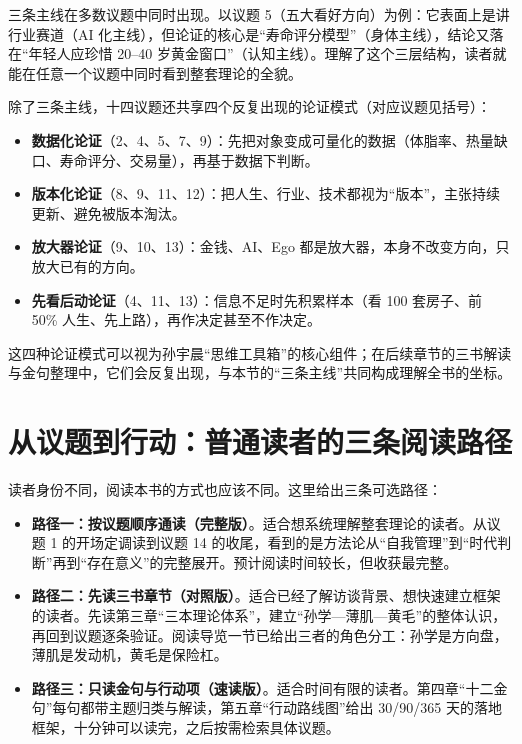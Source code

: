 三条主线在多数议题中同时出现。以议题
5（五大看好方向）为例：它表面上是讲行业赛道（AI
化主线），但论证的核心是``寿命评分模型''（身体主线），结论又落在``年轻人应珍惜
20--40
岁黄金窗口''（认知主线）。理解了这个三层结构，读者就能在任意一个议题中同时看到整套理论的全貌。

除了三条主线，十四议题还共享四个反复出现的论证模式（对应议题见括号）：

\begin{itemize}
\tightlist
\item
  \textbf{数据化论证}（2、4、5、7、9）：先把对象变成可量化的数据（体脂率、热量缺口、寿命评分、交易量），再基于数据下判断。
\item
  \textbf{版本化论证}（8、9、11、12）：把人生、行业、技术都视为``版本''，主张持续更新、避免被版本淘汰。
\item
  \textbf{放大器论证}（9、10、13）：金钱、AI、Ego
  都是放大器，本身不改变方向，只放大已有的方向。
\item
  \textbf{先看后动论证}（4、11、13）：信息不足时先积累样本（看 100
  套房子、前 50\% 人生、先上路），再作决定甚至不作决定。
\end{itemize}

这四种论证模式可以视为孙宇晨``思维工具箱''的核心组件；在后续章节的三书解读与金句整理中，它们会反复出现，与本节的``三条主线''共同构成理解全书的坐标。

\section{从议题到行动：普通读者的三条阅读路径}

读者身份不同，阅读本书的方式也应该不同。这里给出三条可选路径：

\begin{itemize}
\tightlist
\item
  \textbf{路径一：按议题顺序通读（完整版）}。适合想系统理解整套理论的读者。从议题
  1 的开场定调读到议题 14
  的收尾，看到的是方法论从``自我管理''到``时代判断''再到``存在意义''的完整展开。预计阅读时间较长，但收获最完整。
\item
  \textbf{路径二：先读三书章节（对照版）}。适合已经了解访谈背景、想快速建立框架的读者。先读第三章``三本理论体系''，建立``孙学---薄肌---黄毛''的整体认识，再回到议题逐条验证。阅读导览一节已给出三者的角色分工：孙学是方向盘，薄肌是发动机，黄毛是保险杠。
\item
  \textbf{路径三：只读金句与行动项（速读版）}。适合时间有限的读者。第四章``十二金句''每句都带主题归类与解读，第五章``行动路线图''给出
  30/90/365 天的落地框架，十分钟可以读完，之后按需检索具体议题。
\end{itemize}

